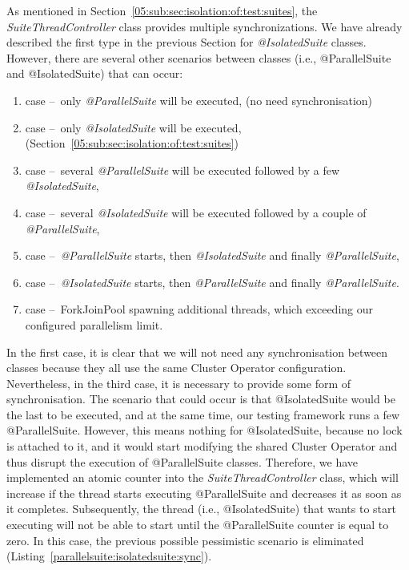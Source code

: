 As mentioned in Section~\ref{05:sub:sec:isolation:of:test:suites}, the \emph{SuiteThreadController} class provides multiple synchronizations.
We have already described the first type in the previous Section for \emph{@IsolatedSuite} classes.
However, there are several other scenarios between classes (i.e., @ParallelSuite and @IsolatedSuite) that can occur:
\begin{enumerate}[itemsep=1mm, parsep=0pt]
    \item case \---\ only \emph{@ParallelSuite} will be executed, (no need synchronisation)
    \item case \---\ only \emph{@IsolatedSuite} will be executed, (Section~\ref{05:sub:sec:isolation:of:test:suites})
    \item case \---\ several \emph{@ParallelSuite} will be executed followed by a few \emph{@IsolatedSuite},
    \item case \---\ several \emph{@IsolatedSuite} will be executed followed by a couple of \emph{@ParallelSuite},
    \item case \---\ \emph{@ParallelSuite} starts, then \emph{@IsolatedSuite} and finally \emph{@ParallelSuite},
    \item case \---\ \emph{@IsolatedSuite} starts, then \emph{@ParallelSuite} and finally \emph{@ParallelSuite}.
    \item case \---\ ForkJoinPool spawning additional threads, which exceeding our configured parallelism limit.
\end{enumerate}
In the first case, it is clear that we will not need any synchronisation between classes because they all use the same
Cluster Operator configuration. Nevertheless, in the third case, it is necessary to provide some form of synchronisation.
The scenario that could occur is that @IsolatedSuite would be the last to be executed, and at the same time, our testing
framework runs a few @ParallelSuite. However, this means nothing for @IsolatedSuite, because no lock is attached to it,
and it would start modifying the shared Cluster Operator and thus disrupt the execution of @ParallelSuite classes.
Therefore, we have implemented an atomic counter into the \emph{SuiteThreadController} class, which will increase
if the thread starts executing @ParallelSuite and decreases it as soon as it completes. Subsequently, the thread
(i.e., @IsolatedSuite) that wants to start executing will not be able to start until the @ParallelSuite counter is equal to zero.
In this case, the previous possible pessimistic scenario is eliminated (Listing~\ref{parallelsuite:isolatedsuite:sync}).


